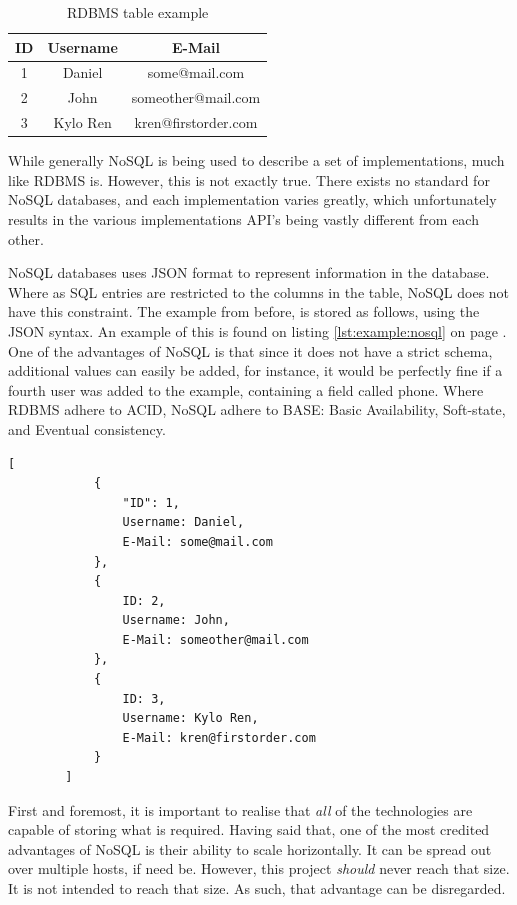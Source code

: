		\begin{table}[h!]
			\centering
			\begin{tabular}{|c|c|c|}
				\hline
				\textbf{ID} 		& 	\textbf{Username} 		& \textbf{E-Mail} 		\\
				\hline
				1 					& Daniel 					& some@mail.com 		\\
				\hline
				2 					& John 						& someother@mail.com 	\\
				\hline
				3 					& Kylo Ren 					& kren@firstorder.com 	\\
				\hline
			\end{tabular}
			\caption{RDBMS table example}
			\label{fig:example:rldb}
		\end{table}

		While generally NoSQL is being used to describe a set of implementations, much like RDBMS is. However, this is not exactly true. There exists no standard for NoSQL databases, and each implementation varies greatly, which unfortunately results in the various implementations API's being vastly different from each other.

		NoSQL databases uses JSON format to represent information in the database. Where as SQL entries are restricted to the columns in the table, NoSQL does not have this constraint. The example from before, is stored as follows, using the JSON syntax. An example of this is found on listing \ref{lst:example:nosql} on page \pageref{lst:example:nosql}. One of the advantages of NoSQL is that since it does not have a strict schema, additional values can easily be added, for instance, it would be perfectly fine if a fourth user was added to the example, containing a field called phone. Where RDBMS adhere to ACID, NoSQL adhere to BASE: Basic Availability, Soft-state, and Eventual consistency.

		\begin{lstlisting}[style=json2,gobble=8, caption={NoSQL table example},label={lst:example:nosql}]
        [
            {
                "ID": 1,
                Username: Daniel,
                E-Mail: some@mail.com
            },
            {
                ID: 2,
                Username: John,
                E-Mail: someother@mail.com
            },
            {
                ID: 3,
                Username: Kylo Ren,
                E-Mail: kren@firstorder.com
            }
        ]
		\end{lstlisting}

		First and foremost, it is important to realise that \emph{all} of the technologies are capable of storing what is required. Having said that, one of the most credited advantages of NoSQL is their ability to scale horizontally. It can be spread out over multiple hosts, if need be. However, this project \emph{should} never reach that size. It is not intended to reach that size. As such, that advantage can be disregarded.

